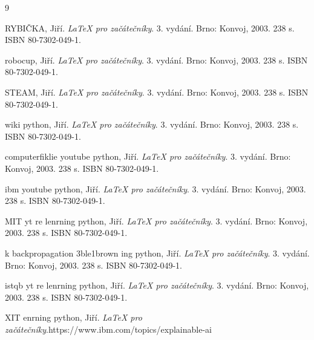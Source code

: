 \documentclass[
  program=ainfk,
  biblatex,
  language=czech,
  figures=true,
  tables ,
  sourcecodes=true,
  glossaries=true,
  index
]{kidiplom}
\begin{document}

 

 \renewcommand{\refname}{Seznam literatury}
\begin{thebibliography}{9}
 
	 RYBIČKA, Jiří.
	\emph{\LaTeX{} pro začátečníky}. 3. vydání.
	Brno: Konvoj, 2003. 238 s. ISBN 80-7302-049-1.

 	 robocup, Jiří.
	\emph{\LaTeX{} pro začátečníky}. 3. vydání.
	Brno: Konvoj, 2003. 238 s. ISBN 80-7302-049-1.

 	 STEAM, Jiří.
	\emph{\LaTeX{} pro začátečníky}. 3. vydání.
	Brno: Konvoj, 2003. 238 s. ISBN 80-7302-049-1.

 	 wiki python, Jiří.
	\emph{\LaTeX{} pro začátečníky}. 3. vydání.
	Brno: Konvoj, 2003. 238 s. ISBN 80-7302-049-1.

 	 computerfiklie youtube python, Jiří.
	\emph{\LaTeX{} pro začátečníky}. 3. vydání.
	Brno: Konvoj, 2003. 238 s. ISBN 80-7302-049-1.

 

 	 ibm youtube python, Jiří.
	\emph{\LaTeX{} pro začátečníky}. 3. vydání.
	Brno: Konvoj, 2003. 238 s. ISBN 80-7302-049-1.

 	 MIT yt re lenrning python, Jiří.
	\emph{\LaTeX{} pro začátečníky}. 3. vydání.
	Brno: Konvoj, 2003. 238 s. ISBN 80-7302-049-1.


 	  k backpropagation  3ble1brown    ing python, Jiří.
	\emph{\LaTeX{} pro začátečníky}. 3. vydání.
	Brno: Konvoj, 2003. 238 s. ISBN 80-7302-049-1.

 	 istqb yt re lenrning python, Jiří.
	\emph{\LaTeX{} pro začátečníky}. 3. vydání.
	Brno: Konvoj, 2003. 238 s. ISBN 80-7302-049-1.


 	 XIT  enrning python, Jiří.
	\emph{\LaTeX{} pro začátečníky}.https://www.ibm.com/topics/explainable-ai

\end{thebibliography}
 
 

\printindex
\end{document}
